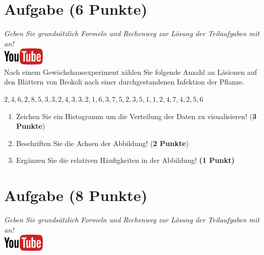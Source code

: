 \documentclass[a4paper, 9pt]{scrartcl}\usepackage[]{graphicx}\usepackage[]{xcolor}
\begin{document}
\section{Aufgabe \hfill (6 Punkte)}

\textit{Geben Sie grunds{\"a}tzlich Formeln und Rechenweg zur L{\"o}sung der
  Teilaufgaben mit an!} \\[1Ex]

\hfill\href{https://youtu.be/aXvxGC4YLqk}{\includegraphics[width =
  2cm]{img/youtube}}\\[1Ex]



Nach einem Gew{\"a}chshausexperiment z{\"a}hlen Sie folgende Anzahl an L{\"a}sionen auf den
Bl{\"a}ttern von Brokoli nach einer durchgestandenen Infektion der Pflanze. 

\begin{center}
$2, 4, 6, 2, 8, 5, 3, 3, 2, 4, 3, 3, 2, 1, 6, 3, 7, 5, 2, 3, 5, 1, 1, 2, 4, 7, 4, 2, 5, 6$
\end{center}

\begin{enumerate}
\item Zeichen Sie ein Histogramm um die Verteilung der Daten zu visualisieren! (\textbf{3 Punkte})
\item Beschriften Sie die Achsen der Abbildung! (\textbf{2 Punkte})
\item Erg{\"a}nzen Sie die relativen H{\"a}ufigkeiten in der Abbildung! \textbf{(1
    Punkt)}  
\end{enumerate}

 
\clearpage

\section{Aufgabe \hfill (8 Punkte)}

\textit{Geben Sie grunds{\"a}tzlich Formeln und Rechenweg zur L{\"o}sung der
  Teilaufgaben mit an!} \\[1Ex]

\hfill\href{https://youtu.be/ORHSPTCdfeY}{\includegraphics[width =
  2cm]{img/youtube}}\\[1Ex]
\end{document}
